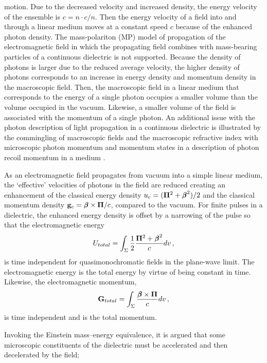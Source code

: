 \documentclass[twocolumn,amssymb,eqsecnum,aps,pra]{revtex4-2}
\begin{document}
motion.
Due to the decreased velocity and increased density, 
the energy velocity of the ensemble is $c=n\cdot c/n$.
Then the energy velocity of a field into and through a linear medium
moves at a constant speed $c$ because of the enhanced photon density.
The mass-polariton (MP) model \cite{BIPart} of propagation of the
electromagnetic field in which the propagating field combines with
mass-bearing particles of a continuous dielectric is not supported.
Because the density of photons is larger due to the reduced average
velocity, the higher density of photons corresponds to an increase
in energy density and momentum density in the macroscopic field.
Then, the macroscopic field in a linear medium that corresponds to
the energy of a single photon occupies a smaller volume than the
volume occupied in the vacuum.
Likewise, a smaller volume of the field is associated with the
momentum of a single photon.
An additional issue with the photon description of light propagation
in a continuous dielectric is illustrated by the commingling of
macroscopic fields and the macroscopic refractive index with
microscopic photon momentum and momentum states in a description of
photon recoil momentum in a medium \cite{BICampbell}.
\par
As an electromagnetic field propagates from vacuum into a simple
linear medium, the `effective' velocities of photons in the field
are reduced creating an enhancement of the classical energy
density $u_c=({\bf \Pi}^2+{{\beta}\hskip -5.6pt {\beta}}^2)/2$ and the classical momentum
density ${\bf g}_c={{\beta}\hskip -5.6pt {\beta}}\times{\bf \Pi}/c$, compared to the vacuum.
For finite pulses in a dielectric, the enhanced energy density is 
offset by a narrowing of the pulse so that the electromagnetic energy 
\begin{equation}
U_{total}=\int_{\Sigma}
\frac{1}{2}\frac{{\bf\Pi}^2+{{\beta}\hskip -5.6pt {\beta}}^2}{c}dv \, ,
\label{EQq10.03}
\end{equation}
is time independent for quasimonochromatic fields in the plane-wave
limit.
The electromagnetic energy is the total energy by virtue of being
constant in time.
Likewise, the electromagnetic momentum,
\begin{equation}
{\bf G}_{total}=\int_{\Sigma} \frac{{{\beta}\hskip -5.6pt {\beta}}\times{\bf \Pi}}{c} dv \,,
\label{EQq10.04}
\end{equation}
is time independent and is the total momentum.
\par
Invoking the Einstein mass--energy equivalence, it is argued that
some microscopic constituents of the dielectric must be accelerated
and then decelerated by the field;
\end{document}
